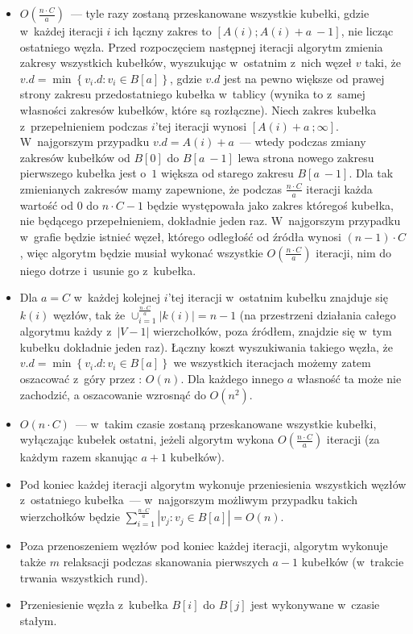 \begin{itemize}
\item $ O \left( \frac{n \cdot C}{a} \right) $~--- tyle razy zostaną przeskanowane wszystkie kubełki, gdzie w~każdej iteracji $i$ ich łączny zakres to $ \left [ A \left( i \right) ; A \left( i \right) + a~- 1 \right] $, nie licząc ostatniego węzła. Przed rozpoczęciem następnej iteracji algorytm zmienia zakresy wszystkich kubełków, wyszukując w~ostatnim z~nich węzeł $v$ taki, że $ v.d = \min \left\{ v_{i}.d : v_{i} \in B \left[ a \right] \right\}$, gdzie $v.d$ jest na pewno większe od prawej strony zakresu przedostatniego kubełka w~tablicy (wynika to z~samej własności zakresów kubełków, które są rozłączne). Niech zakres kubełka z~przepełnieniem podczas $i$'tej iteracji wynosi $ \left [ A \left( i \right) + a~; \infty \right] $.  W~najgorszym przypadku $v.d = A \left( i \right) + a$~--- wtedy podczas zmiany zakresów kubełków od $B \left[ 0 \right]$ do $B \left[ a~-1 \right]$ lewa strona nowego zakresu pierwszego kubełka jest o~$1$ większa od starego zakresu $B \left[ a~-1 \right]$. Dla tak zmienianych zakresów mamy zapewnione, że podczas  $\frac{n \cdot C}{a} $ iteracji każda wartość od $0$ do $n \cdot C - 1 $ będzie występowała jako zakres któregoś kubełka, nie będącego przepełnieniem, dokładnie jeden raz. W~najgorszym przypadku w~grafie będzie istnieć węzeł, którego odległość od źródła wynosi $ \left( n - 1 \right) \cdot C$, więc algorytm będzie musiał wykonać wszystkie $O \left( \frac{n \cdot C}{a} \right)$ iteracji, nim do niego dotrze i~usunie go z~kubełka.
\item Dla $a=C$ w~każdej kolejnej $i$'tej iteracji w~ostatnim kubełku znajduje się $k \left( i \right) $ węzłów, tak że $\cup _{i = 1}^{\frac{n \cdot C}{a}} \left| k \left( i \right) \right| = n - 1 $ (na przestrzeni działania całego algorytmu każdy z~$\left| V - 1 \right|$ wierzchołków, poza źródłem, znajdzie się w~tym kubełku dokładnie jeden raz). Łączny koszt wyszukiwania takiego węzła, że $ v.d = \min \left\{ v_{i}.d : v_{i} \in B \left[ a \right] \right\}$ we wszystkich iteracjach możemy zatem oszacować z~góry przez : $ O \left( n \right)$. Dla każdego innego $a$ własność ta może nie zachodzić, a oszacowanie wzrosnąć do $ O \left( n^{2} \right)$.
\item $ O \left( n \cdot C \right)$~--- w~takim czasie zostaną przeskanowane wszystkie kubełki, wyłączając kubełek ostatni, jeżeli algorytm wykona $ O \left( \frac{n \cdot C}{a} \right) $ iteracji (za każdym razem skanując $a+1$ kubełków).
\item Pod koniec każdej iteracji algorytm wykonuje przeniesienia wszystkich węzłów z~ostatniego kubełka~--- w~najgorszym możliwym przypadku takich wierzchołków będzie $ \sum_{i=1}^{\frac{n \cdot C}{a}} \left| v_{j} : v_{j} \in B \left[ a \right] \right| = O \left( n \right)$.
\item Poza przenoszeniem węzłów pod koniec każdej iteracji, algorytm wykonuje także $m$ relaksacji podczas skanowania pierwszych $a-1$ kubełków (w~trakcie trwania wszystkich rund).
\item Przeniesienie węzła z~kubełka $ B \left[ i \right] $ do $ B \left[ j \right]$ jest wykonywane w~czasie stałym.
\end{itemize}

